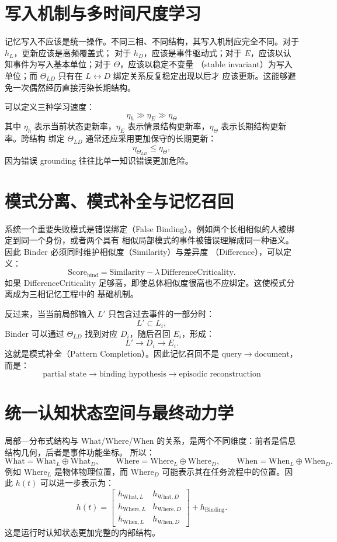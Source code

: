 \section{写入机制与多时间尺度学习}

记忆写入不应该是统一操作。不同三相、不同结构，其写入机制应完全不同。对于 $h_L$，更新应该是高频覆盖式；
对于 $h_D$，应该是事件驱动式；对于 $E$，应该以认知事件为写入基本单位；对于 $\Theta$，应该以稳定不变量
（stable invariant）为写入单位；而 $\Theta_{LD}$ 只有在 $L\leftrightarrow D$ 绑定关系反复稳定出现以后才
应该更新。这能够避免一次偶然经历直接污染长期结构。

可以定义三种学习速度：
\[
\boxed{
\eta_h\gg\eta_E\gg\eta_\Theta
}
\]
其中 $\eta_h$ 表示当前状态更新率，$\eta_E$ 表示情景结构更新率，$\eta_\Theta$ 表示长期结构更新率。跨结构
绑定 $\Theta_{LD}$ 通常还应采用更加保守的长期更新：
\[
\eta_{\Theta_{LD}}\leq\eta_\Theta,
\]
因为错误 grounding 往往比单一知识错误更加危险。

\section{模式分离、模式补全与记忆召回}

系统一个重要失败模式是错误绑定（False Binding）。例如两个长相相似的人被绑定到同一个身份，或者两个具有
相似局部模式的事件被错误理解成同一种语义。因此 Binder 必须同时维护相似度（Similarity）与差异度
（Difference），可以定义：
\[
\mathrm{Score}_{\mathrm{bind}}
=
\mathrm{Similarity}
-\lambda\,\mathrm{DifferenceCriticality}.
\]
如果 DifferenceCriticality 足够高，即使总体相似度很高也不应绑定。这使模式分离成为三相记忆工程中的
基础机制。

反过来，当当前局部输入 $L'$ 只包含过去事件的一部分时：
\[
L'\subset L_i,
\]
Binder 可以通过 $\Theta_{LD}$ 找到对应 $D_i$，随后召回 $E_i$，形成：
\[
L'\rightarrow D_i\rightarrow E_i.
\]
这就是模式补全（Pattern Completion）。因此记忆召回不是 $\mathrm{query}\rightarrow\mathrm{document}$，
而是：
\[
\boxed{
\text{partial state}\rightarrow\text{binding hypothesis}\rightarrow\text{episodic reconstruction}
}
\]

\section{统一认知状态空间与最终动力学}

局部—分布式结构与 What/Where/When 的关系，是两个不同维度：前者是信息结构几何，后者是事件功能坐标。
所以：
\[
\mathrm{What}=\mathrm{What}_L\oplus\mathrm{What}_D,
\qquad
\mathrm{Where}=\mathrm{Where}_L\oplus\mathrm{Where}_D,
\qquad
\mathrm{When}=\mathrm{When}_L\oplus\mathrm{When}_D.
\]
例如 $\mathrm{Where}_L$ 是物体物理位置，而 $\mathrm{Where}_D$ 可能表示其在任务流程中的位置。因此
$h(t)$ 可以进一步表示为：
\[
h(t)
=
\begin{bmatrix}
h_{\mathrm{What},L} & h_{\mathrm{What},D}\\
h_{\mathrm{Where},L} & h_{\mathrm{Where},D}\\
h_{\mathrm{When},L} & h_{\mathrm{When},D}
\end{bmatrix}
+h_{\mathrm{Binding}}.
\]
这是运行时认知状态更加完整的内部结构。

